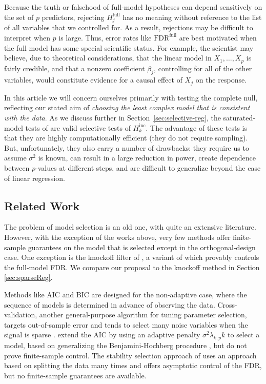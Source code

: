 \documentclass{article}
\begin{document}
Because the truth or falsehood of full-model hypotheses can depend sensitively on the set of $p$ predictors, rejecting $H_j^{\text{full}}$ has no meaning without reference to the list of all variables that we controlled for. As a result, rejections may be difficult to interpret when $p$ is large. Thus, error rates like $\text{FDR}^{\text{full}}$ are best motivated when the full model has some special scientific status. For example, the scientist may believe, due to theoretical considerations, that the linear model in $X_1,\ldots,X_p$ is fairly credible, and that a nonzero coefficient $\beta_j$, controlling for all of the other variables, would constitute evidence for a causal effect of $X_j$ on the response. 

In this article we will concern ourselves primarily with testing the complete null, reflecting our stated aim of {\em choosing the least complex model that is consistent with the data}. As we discuss further in Section~\ref{sec:selective-reg}, the saturated-model tests of \citet{tibshirani2014exact} are valid selective tests of $H_k^{\text{inc}}$. The advantage of these tests is that they are highly computationally efficient (they do not require sampling). But, unfortunately, they also carry a number of drawbacks: they require us to assume $\sigma^2$ is known, can result in a large reduction in power, create dependence between $p$-values at different steps, and are difficult to generalize beyond the case of linear regression.

\subsection{Related Work}

The problem of model selection is an old one, with quite an extensive literature. However, with the exception of the works above, very few methods offer finite-sample guarantees on the model that is selected except in the orthogonal-design case. One  exception is the knockoff filter of \citet{barber2014controlling}, a variant of which provably controls the full-model FDR.
We compare our proposal to the knockoff method in Section \ref{sec:sparseReg}.

Methods like AIC \citep{akaike1974new} and BIC \citep{schwarz1978estimating} are designed for the non-adaptive case, where the sequence of models is determined in advance of observing the data. Cross-validation, another general-purpose algorithm for tuning parameter selection, targets out-of-sample error and tends to select many noise variables when the signal is sparse \citep[e.g.][]{LY2015}. \citet{benjamini2009simple} extend the AIC by using an adaptive penalty $\sigma^2\lambda_{k,p} k$ to select a model, based on generalizing the Benjamini-Hochberg procedure \citep{benjamini1995controlling}, but do not prove finite-sample control. The stability selection approach of \citet{meinshausen2010stability} uses an approach based on splitting the data many times and offers asymptotic control of the FDR, but no finite-sample guarantees are available.
\end{document}
